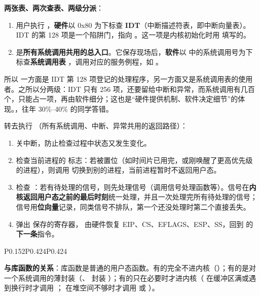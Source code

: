 \textbf{两张表、两次查表、两级分派}：
\begin{enumerate}
    \item 用户执行 ，\textbf{硬件}以 0x80 为下标查 \textbf{IDT}（中断描述符表，即中断向量表）。IDT 的第 128 项是一个陷阱门，指向 。这一项是内核初始化时用  填写的。
    \item {} 是\textbf{所有系统调用共用的总入口}。它保存现场后，\textbf{软件}以  中的系统调用号为下标查\textbf{系统调用表} ，调用对应的服务例程，如 。
\end{enumerate}
所以  一方面是 IDT 第 128 项登记的处理程序，另一方面又是系统调用表的使用者。之所以分两级：IDT 只有 256 项，还要留给中断和异常，而系统调用有几百个，只能占一项，再由软件细分；这也是“硬件提供机制、软件决定细节”的体现。\bk {}，往年 30\%–40\% 的同学答错。

转去执行 （所有系统调用、中断、异常共用的返回路径）：
\begin{enumerate}
    \item {} 关中断，防止检查过程中状态又发生变化。
    \item 检查当前进程的  标志：若被置位（如时间片已用完，或刚唤醒了更高优先级的进程），则调用  切换到别的进程，当前进程暂时不返回用户态。
    \item 检查 ：若有待处理的信号，则先处理信号（调用信号处理函数等）。信号在\textbf{内核返回用户态之前的最后时刻}统一处理，并且一次处理完所有待处理的信号；信号用\textbf{位向量}记录，同类信号不排队，第一个还没处理时第二个直接丢失。
    \item {} 弹出  保存的寄存器， 由硬件恢复 EIP、CS、EFLAGS、ESP、SS，回到  的\textbf{下一条}指令。
\end{enumerate}

\begin{btab}{P{0.152}P{0.424}P{0.424}}
\end{btab}
\textbf{与库函数的关系}：库函数是普通的用户态函数。有的完全不进内核（）；有的是对一个系统调用的薄封装（、 封装 ）；有的只在必要时才进内核（ 在缓冲区满或遇到换行时才调用 ； 在堆空间不够时才调用  或 ）。


